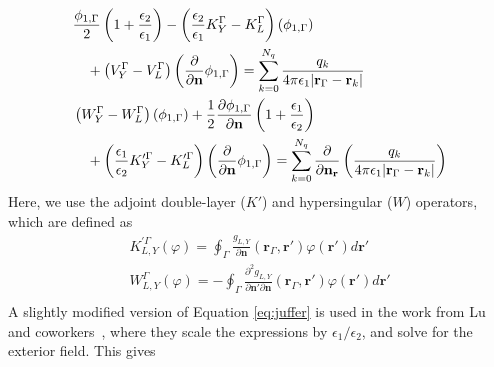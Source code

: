 \begin{align}\label{eq:juffer}
    &\begin{multlined}[t][0.48\textwidth] \frac{\phi_{1,\Gamma}}{2}\left(1+\frac{\epsilon_2}{\epsilon_1}\right) - \left(\frac{\epsilon_2}{\epsilon_1}K_Y^\Gamma - K_L^\Gamma\right)(\phi_{1,\Gamma}) \\
    + \left(V_Y^\Gamma - V_L^\Gamma\right)\left( \frac{\partial}{\partial \mathbf{n}} \phi_{1,\Gamma} \right) = \sum_{k=0}^{N_q}  \frac{q_k}{4\pi\epsilon_1|\mathbf{r}_{\Gamma} - \mathbf{r}_k|}
    \end{multlined} \nonumber \\
    &\begin{multlined}[t][0.48\textwidth] \left(W_Y^\Gamma - W_L^\Gamma\right)(\phi_{1,\Gamma}) +  \frac{1}{2}\frac{\partial\phi_{1,\Gamma}}{\partial\mathbf{n}}\left(1+\frac{\epsilon_1}{\epsilon_2}\right) \\
    + \left(\frac{\epsilon_1}{\epsilon_2}K_Y^{\prime\Gamma} - K_L^{\prime\Gamma}\right)\left( \frac{\partial}{\partial \mathbf{n}} \phi_{1,\Gamma} \right) = \sum_{k=0}^{N_q}  \frac{\partial}{\partial\mathbf{n}_\mathbf{r}}\left(\frac{q_k}{4\pi\epsilon_1|\mathbf{r}_{\Gamma} - \mathbf{r}_k|}\right)
    \end{multlined}
\end{align}
%
Here, we use the adjoint double-layer ($K'$) and hypersingular ($W$) operators, which are defined as
%
\begin{align}\label{eq:adj_hyp}
K^{\prime\Gamma}_{L,Y}(\varphi) = \oint_\Gamma \frac{g_{L,Y}}{\partial\mathbf{n}}(\mathbf{r}_\Gamma,\mathbf{r}')\varphi(\mathbf{r}')d\mathbf{r}'\nonumber\\
W^\Gamma_{L,Y}(\varphi) = - \oint_\Gamma \frac{\partial^2 g_{L,Y}}{\partial\mathbf{n}'\partial\mathbf{n}}(\mathbf{r}_\Gamma,\mathbf{r}')\varphi(\mathbf{r}')d\mathbf{r}'\nonumber\\
\end{align}
%
A slightly modified version of Equation \eqref{eq:juffer} is used in the work from Lu and coworkers~\cite{LuETal2006,LuETal2009,ZhangETal2019}, where they scale the expressions by $\epsilon_1/\epsilon_2$, and solve for the exterior field. This gives
%
